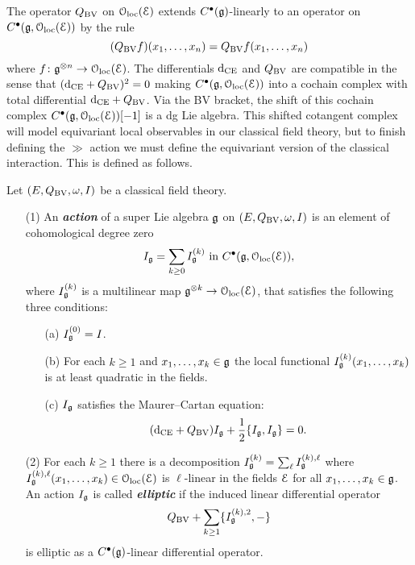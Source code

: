 \documentclass[10pt, oneside]{article}
\newcommand{\defterm}[1]{\textbf{\emph{#1}}}
\begin{document}
The operator $Q_{\mathrm{BV}}$ on $\mathcal{O}_{\rm loc}(\mathcal E)$ extends $C^\bullet(\mathfrak g)$-linearly to an operator on $C^\bullet(\mathfrak g, \mathcal{O}_{\rm loc}(\mathcal E))$ by the rule
\[
(Q_{\mathrm{BV}} f)(x_1,\ldots, x_n) = Q_{\mathrm{BV}} f(x_1,\ldots, x_n) 
\]
where $f \colon \mathfrak g^{\otimes n} \to \mathcal{O}_{\rm loc}(\mathcal E)$. 
The differentials ${\rm d}_{\mathrm{CE}}$ and $Q_{\mathrm{BV}}$ are compatible in the sense that $({\rm d}_{\mathrm{CE}} + Q_{\mathrm{BV}})^2 = 0$ making $C^\bullet(\mathfrak g, \mathcal{O}_{\rm loc}(\mathcal E))$ into a cochain complex with total differential ${\rm d}_{\mathrm{CE}} + Q_{\mathrm{BV}}$. 
Via the BV bracket, the shift of this cochain complex $C^\bullet(\mathfrak g, \mathcal{O}_{\rm loc}(\mathcal E))[-1]$ is a dg Lie algebra.  This shifted cotangent complex will model equivariant local observables in our classical field theory, but to finish defining the $\gg$ action we must define the equivariant version of the classical interaction.  This is defined as follows.

\begin{definition}
\label{infinitesimal_action_def}
Let $(E, Q_{\mathrm{BV}},\omega, I)$ be a classical field theory. 
\begin{itemize}
\item[(1)]
An \defterm{action} of a super Lie algebra $\mathfrak g$ on $(E, Q_{\mathrm{BV}}, \omega, I)$ is an element of cohomological degree zero 
\[I_\mathfrak g = \sum_{k\geq 0} I_{\mathfrak g}^{(k)} \text{ in } C^\bullet(\mathfrak g, \mathcal{O}_{\rm loc}(\mathcal E)),\]
where $I_\mathfrak g^{(k)}$ is a multilinear map $\mathfrak g^{\otimes k} \to \mathcal{O}_{\rm loc}(\mathcal E)$, that satisfies the following three conditions:
\begin{itemize}
\item[(a)] $I_\mathfrak g^{(0)} = I$.
\item[(b)] For each $k \geq 1$ and $x_1, \ldots, x_k \in \mathfrak g$ the local functional $I^{(k)}_\mathfrak g (x_1,\ldots, x_k)$ is at least quadratic in the fields.
\item[(c)] $I_\mathfrak g$ satisfies the Maurer--Cartan equation:
\[({\rm d}_{\mathrm{CE}} + Q_{\mathrm{BV}}) I_\mathfrak g + \frac{1}{2} \{I_\mathfrak g, I_\mathfrak g\} = 0.\]
\end{itemize}
\item[(2)]
For each $k \geq 1$ there is a decomposition $I_\mathfrak g^{(k)} = \sum_{\ell} I_\mathfrak g^{(k),\ell}$ where $ I_\mathfrak g^{(k),\ell}(x_1,\ldots,x_k) \in \mathcal{O}_{\rm loc}(\mathcal E)$ is $\ell$-linear in the fields $\mathcal E$ for all $x_1,\ldots,x_k \in \mathfrak g$.
An action $I_\mathfrak g$ is called \defterm{elliptic} if the induced linear differential operator
\[
Q_{\mathrm{BV}} + \sum_{k \geq 1} \{I_\mathfrak g^{(k),2}, -\}
\]
is elliptic as a $C^\bullet(\mathfrak g)$-linear differential operator.
\end{itemize}
\end{definition}
\end{document}
